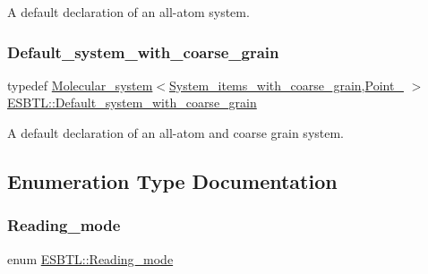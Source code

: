 A default declaration of an all-\/atom system. \mbox{\label{namespaceESBTL_a6050f8db412cd612ac31dcb54e355dfd}} 
\subsubsection{\texorpdfstring{Default\+\_\+system\+\_\+with\+\_\+coarse\+\_\+grain}{Default\_system\_with\_coarse\_grain}}
{\footnotesize\ttfamily typedef \hyperlink{classESBTL_1_1Molecular__system}{Molecular\+\_\+system}$<$\hyperlink{structESBTL_1_1System__items__with__coarse__grain}{System\+\_\+items\+\_\+with\+\_\+coarse\+\_\+grain},\hyperlink{classESBTL_1_1Point__3}{Point\+\_} $>$ \hyperlink{namespaceESBTL_a6050f8db412cd612ac31dcb54e355dfd}{E\+S\+B\+T\+L\+::\+Default\+\_\+system\+\_\+with\+\_\+coarse\+\_\+grain}}

A default declaration of an all-\/atom and coarse grain system. 

\subsection{Enumeration Type Documentation}
\mbox{\label{namespaceESBTL_a46426c3ec10681a36a08e798f8f0f72a}} 
\subsubsection{\texorpdfstring{Reading\+\_\+mode}{Reading\_mode}}
{\footnotesize\ttfamily enum \hyperlink{namespaceESBTL_a46426c3ec10681a36a08e798f8f0f72a}{E\+S\+B\+T\+L\+::\+Reading\+\_\+mode}}

